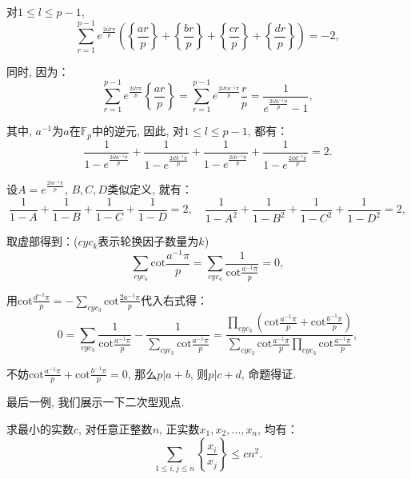 \documentclass[lang=cn,12pt,thmcnt=section]{elegantbook}
\begin{document}
\begin{solution}
对$1\le l\le p-1$, 
\[
\sum_{r=1}^{p-1} e^{\frac{2ilr\pi}{p}}\left(\left\{\frac{ar}{p}\right\}+\left\{\frac{br}{p}\right\}+\left\{\frac{cr}{p}\right\}+\left\{\frac{dr}{p}\right\}\right)=-2,
\]

同时, 因为：
\[
\sum_{r=1}^{p-1} e^{\frac{2ilr\pi}{p}}\left\{\frac{ar}{p}\right\}=\sum_{r=1}^{p-1} e^{\frac{2ilra^{-1}\pi}{p}}\frac{r}{p}=\frac{1}{e^{\frac{2ila^{-1}\pi}{p}}-1},
\]

其中, $a^{-1}$为$a$在$\mathbb{F}_p$中的逆元, 因此, 对$1\le l\le p-1$, 都有：
\[
\frac{1}{1-e^{\frac{2ila^{-1}\pi}{p}}}+\frac{1}{1-e^{\frac{2ilb^{-1}\pi}{p}}}+\frac{1}{1-e^{\frac{2ilc^{-1}\pi}{p}}}+\frac{1}{1-e^{\frac{2ild^{-1}\pi}{p}}}=2.
\]

设$A=e^{\frac{2ia^{-1}\pi}{p}}$, $B,C,D$类似定义, 就有：
\[
\frac{1}{1-A}+\frac{1}{1-B}+\frac{1}{1-C}+\frac{1}{1-D}=2,\quad{}\frac{1}{1-A^2}+\frac{1}{1-B^2}+\frac{1}{1-C^2}+\frac{1}{1-D^2}=2,
\]

取虚部得到：($cyc_k$表示轮换因子数量为$k$)
\[
\sum_{cyc_4}\mathrm{cot}\frac{a^{-1}\pi}{p}=\sum_{cyc_4}\frac{1}{\mathrm{cot}\frac{a^{-1}\pi}{p}}=0,
\]

用$\mathrm{cot}\frac{d^{-1}\pi}{p}=-\sum_{cyc_3}\mathrm{cot}\frac{2a^{-1}\pi}{p}$代入右式得：
\[
0=\sum_{cyc_3}\frac{1}{\mathrm{cot}\frac{a^{-1}\pi}{p}}-\frac{1}{\sum_{cyc_3}\mathrm{cot}\frac{a^{-1}\pi}{p}}=\frac{\prod_{cyc_3}(\mathrm{cot}\frac{a^{-1}\pi}{p}+\mathrm{cot}\frac{b^{-1}\pi}{p})}{\sum_{cyc_3}\mathrm{cot}\frac{a^{-1}\pi}{p}\prod_{cyc_3}\mathrm{cot}\frac{a^{-1}\pi}{p}},
\]

不妨$\mathrm{cot}\frac{a^{-1}\pi}{p}+\mathrm{cot}\frac{b^{-1}\pi}{p}=0$, 那么$p|a+b$, 则$p|c+d$, 命题得证.
\end{solution}

最后一例, 我们展示一下二次型观点.

\begin{example}
求最小的实数$c$, 对任意正整数$n$, 正实数$x_1,x_2,\dots{},x_n$, 均有：
\[
\sum_{1\le i,j\le n}\left\{\frac{x_i}{x_j}\right\}\le cn^2.
\]
\end{example}
\end{document}
